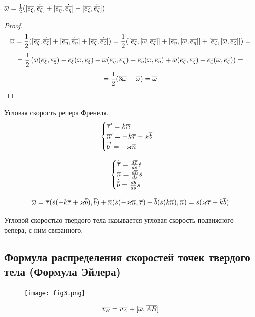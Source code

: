   \begin{ass}
  $ {\overline{\omega}} = \frac{1}{2} ([{\overline{e_{\xi}}}, \dot{{\overline{e_{\xi}}}}] + [{\overline{e_{\eta}}}, \dot{{\overline{e_{\eta}}}}] + [{\overline{e_{\zeta}}}, \dot{{\overline{e_{\zeta}}}}]) $
  \end{ass}
  \begin{proof}
  $$ {\overline{\omega}} 
  = \frac{1}{2} ([{\overline{e_{\xi}}}, \dot{{\overline{e_{\xi}}}}] + [{\overline{e_{\eta}}}, \dot{{\overline{e_{\eta}}}}] + [{\overline{e_{\zeta}}}, \dot{{\overline{e_{\zeta}}}}]) 
  = \frac{1}{2} ([{\overline{e_{\xi}}}, [{\overline{\omega}}, {\overline{e_{\xi}}}]] + [{\overline{e_{\eta}}}, [{\overline{\omega}}, {\overline{e_{\eta}}}]] + [{\overline{e_{\zeta}}}, [{\overline{\omega}}, {\overline{e_{\zeta}}}]]) = $$
  $$ = \frac{1}{2} \left( {\overline{\omega}}({\overline{e_{\xi}}}, {\overline{e_{\xi}}}) - {\overline{e_{\xi}}}({\overline{\omega}}, {\overline{e_{\xi}}}) + {\overline{\omega}}({\overline{e_{\eta}}}, {\overline{e_{\eta}}}) - {\overline{e_{\eta}}}({\overline{\omega}}, {\overline{e_{\eta}}}) + {\overline{\omega}}({\overline{e_{\zeta}}}, {\overline{e_{\zeta}}}) - {\overline{e_{\zeta}}}({\overline{\omega}}, {\overline{e_{\zeta}}}) \right) = $$ 
  $$ = \frac{1}{2}(3{\overline{\omega}} - {\overline{\omega}}) = {\overline{\omega}} $$
  \end{proof}
  
  \begin{xmp}
  Угловая скорость репера Френеля.
  $$ 
  \begin{cases}
  {\overline{\tau}}' = k {\overline{n}} \\
  {\overline{n}}' = - k{\overline{\tau}} + \varkappa {\overline{b}} \\
  {\overline{b}}' = -\varkappa{\overline{n}}
  \end{cases}
  $$
  
  $$
  \begin{cases}
  \dot{{\overline{\tau}}} = \frac{d{\overline{\tau}}}{ds} \dot s \\
  \dot{{\overline{n}}} = \frac{d{\overline{n}}}{ds} \dot s \\
  \dot{{\overline{b}}} = \frac{d{\overline{b}}}{ds} \dot s \\
  \end{cases} 
  $$
  
  $$ {\overline{\omega}} = {\overline{\tau}}(\dot s (-k{\overline{\tau}} + \varkappa{\overline{b}}), {\overline{b}}) + {\overline{n}}(\dot s (-\varkappa{\overline{n}}, {\overline{\tau}}) + {\overline{b}}(\dot s(k {\overline{n}}), {\overline{n}}) = \dot s (\varkappa{\overline{\tau}} + k{\overline{b}}) $$
  \end{xmp}
  
  \begin{df}
  Угловой скоростью твердого тела называется угловая скорость подвижного репера, с ним связанного.
  \end{df}
 
  \subsection{Формула распределения скоростей точек твердого тела (Формула Эйлера)}
  \begin{figure}[H]
  \centering
  \texttt{[image: fig3.png]} 
  \end{figure}  
  $$ {\overline{v_B}} = {\overline{v_A}} + [{\overline{\omega}}, {\overline{AB}}] $$
  
